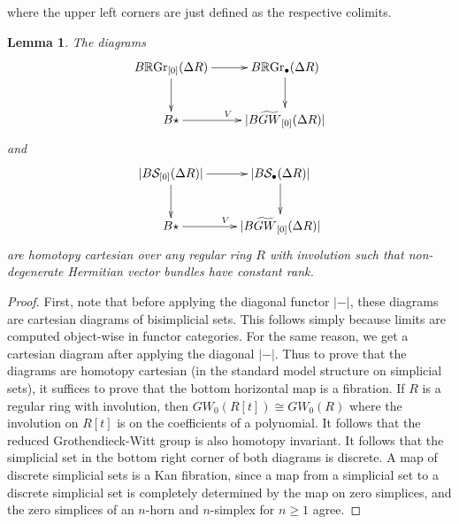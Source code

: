 \documentclass[edeposit,fullpage]{uiucthesis2009}
\newcommand{\Z}{\mathbb Z}
\newcommand{\mbb}{\mathbb}
\newcommand{\mc}{\mathcal}
\newcommand{\RGr}{\mathbb R\mathrm{Gr}}
\DeclareMathOperator*{\colim}{colim}
\theoremstyle{plain}
\newtheorem{lemma}{Lemma}
\numberwithin{lemma}{section}
\theoremstyle{definition}
\begin{document}
where the upper left corners are just defined as the respective colimits. 

\begin{lemma}\label{lem:requires_reg}
The diagrams
\[
\xymatrix{B\RGr_{[0]}(\Delta R) \ar[r]\ar[d] & B\RGr_\bullet(\Delta R) \ar[d] \\ B\star \ar[r]^V & |B\widetilde{GW}_{[0]}(\Delta R)|}
\]
and 
\[
\xymatrix{|B\mc S_{[0]}(\Delta R)| \ar[r]\ar[d] & |B\mc S_\bullet(\Delta R)| \ar[d] \\ B\star \ar[r]^V &
  |B\widetilde{GW}_{[0]}(\Delta R)|}
\]
are homotopy cartesian over any regular ring $R$ with involution such that
non-degenerate Hermitian vector bundles have constant rank.
\end{lemma}

\begin{proof}



First, note that before applying the diagonal functor $| - |$, these
diagrams are cartesian diagrams of bisimplicial sets. This follows
simply because limits are computed object-wise in functor
categories. For the same reason, we get a cartesian diagram after
applying the diagonal $| - |$. Thus to prove that the diagrams are homotopy
cartesian (in the standard model structure on simplicial sets), it
suffices to prove that the bottom horizontal map is a fibration. If $R$
is a regular ring with involution, then $GW_0(R[t]) \cong GW_0(R)$
where the involution on $R[t]$ is on the coefficients of a
polynomial. It follows that the reduced Grothendieck-Witt group is
also homotopy invariant. It follows that the simplicial set in the bottom right
corner of both diagrams is discrete. A map of discrete simplicial sets
is a Kan fibration, since a map from a simplicial set to a discrete
simplicial set is completely determined by the map on zero simplices,
and the zero simplices of an $n$-horn and $n$-simplex for $n \geq 1$ agree.
\end{proof}
\end{document}
